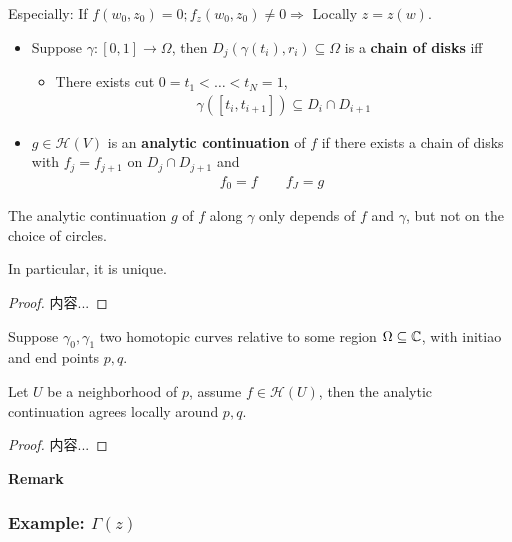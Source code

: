 \documentclass[Total.tex]{subfiles}
\begin{document}
			Especially: If $f(w_0,z_0)=0;f_z(w_0,z_0)\not=0\Rightarrow $ Locally $z=z(w)$.
			
			\begin{Def}
				\begin{itemize}
					\item Suppose $\gamma:[0,1]\rightarrow \Omega$, then $D_j(\gamma(t_i),r_i)\subseteq \Omega$ is a \textbf{chain of disks} iff
					\begin{itemize}
						\item There exists cut $0=t_1<\dots<t_N=1$,
						\begin{gather*}
							\gamma([t_i,t_{i+1}])\subseteq D_i\cap D_{i+1}
						\end{gather*}
					\end{itemize}
					\item $g\in \mathcal{H}(V)$ is an \textbf{analytic continuation} of $f$ if there exists a chain of disks with $f_j=f_{j+1}$ on $D_j\cap D_{j+1}$ and 
					\begin{gather*}
						f_0=f\qquad f_J=g
					\end{gather*}
				\end{itemize}
			\end{Def}
			
			\begin{lemma}
				The analytic continuation $g$ of $f$ along $\gamma$ only depends of $f$ and $\gamma$, but not on the choice of circles. 
				
				In particular, it is unique.
			\end{lemma}
			\begin{proof}
				内容...
			\end{proof}
			
			\begin{theorem}
				Suppose $\gamma_0,\gamma_1$ two homotopic curves relative to some region $\Omega\subseteq \mathbb{C}$, with initiao and end points $p,q$. 
				
				Let $U$ be a neighborhood of $p$, assume $f\in \mathcal{H}(U)$, then the analytic continuation agrees locally around $p,q$.
			\end{theorem}
			\begin{proof}
				内容...
			\end{proof}
			
			\textbf{Remark}
			
			\subsubsection{Example: $\Gamma(z)$}
			
\end{document}
